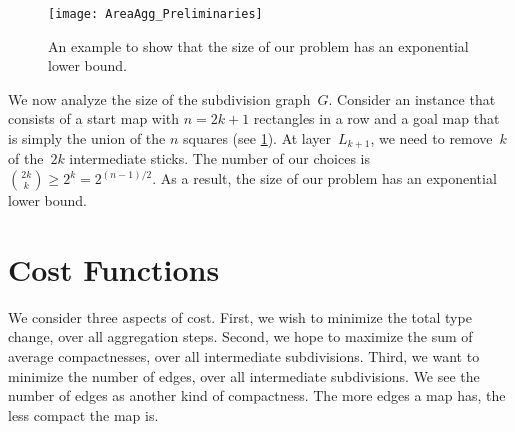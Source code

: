 \begin{figure}[tb]
	\centering
	\texttt{[image: AreaAgg\_Preliminaries]}
	\caption{An example to show that the size of our problem 
	has an exponential lower bound.}
	\label{fig:AreaAgg_ExponentialSize}
\end{figure}

We now analyze the size of the subdivision graph~$G$.
%
%
Consider an instance that consists of 
a start map with $n=2k+1$ rectangles in a row and
a goal map that is simply the union of the $n$ squares
(see \fig\ref{fig:AreaAgg_ExponentialSize}).
At layer~$L_{k+1}$, we need to remove~$k$ of the~$2k$ intermediate sticks. 
The number of our choices is ${{2k}\choose{k}} \ge 2^k = 2^{(n-1)/2}$.
As a result, the size of our problem has an exponential lower bound.


\section{Cost Functions}
\label{sec:AreaAgg_CostFunctions}
We consider three aspects of cost. 
First, we wish to minimize the total type change, 
over all aggregation steps. 
Second, we hope to maximize the sum of average compactnesses,
over all intermediate subdivisions.
Third, we want to minimize the number of edges,
over all intermediate subdivisions.
We see the number of edges as another kind of compactness. 
The more edges a map has, the less compact the map is.

